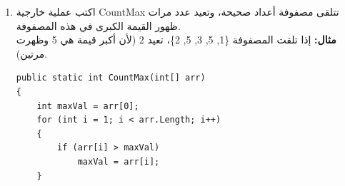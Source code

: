 \documentclass[14pt]{extarticle}
\begin{document}
\begin{enumerate}[itemsep=3em]
\begin{english}
\begin{enumerate}[itemsep=1.5em]
        \item \texttt{Console.WriteLine(arr[7]);}\\
        \\ \underline{\hspace{10cm}}
        \ifwithsols
        \begin{boxSolution}
        \textbf{الجواب:} \textbf{خطأ في وقت التشغيل} (\textenglish{IndexOutOfRangeException})\\
        \textbf{السبب:} الفهرس 7 خارج حدود المصفوفة. آخر فهرس صالح هو 6.
        \end{boxSolution}
        \fi

        \item \texttt{Console.WriteLine(arr[arr.Length]);}\\
        \\ \underline{\hspace{10cm}}
        \ifwithsols
        \begin{boxSolution}
        \textbf{الجواب:} \textbf{خطأ في وقت التشغيل} (\textenglish{IndexOutOfRangeException})\\
        \textbf{السبب:} \textenglish{arr.Length} يساوي 7، لكن آخر فهرس صالح هو 6. هذا خطأ شائع!
        \end{boxSolution}
        \fi

        \item \texttt{Console.WriteLine(arr[arr.Length - 1]);}\\
        \\ \underline{\hspace{10cm}}
        \ifwithsols
        \begin{boxSolution}
        \textbf{الجواب:} \textenglish{12}\\
        \textbf{السبب:} \textenglish{arr.Length - 1} يساوي $7 - 1 = 6$، والعنصر في الموقع 6 هو 12. هذه هي الطريقة الصحيحة للوصول إلى آخر عنصر!
        \end{boxSolution}
        \fi
    \end{enumerate}
    \end{english}
    \clearpage

    \item
    اكتب عملية خارجية \textenglish{CountMax} تتلقى مصفوفة أعداد صحيحة، وتعيد عدد مرات ظهور القيمة الكبرى في هذه المصفوفة. \\
    \textbf{مثال:} إذا تلقت المصفوفة \textenglish{\{1, 5, 3, 5, 2\}}، تعيد 2 (لأن أكبر قيمة هي 5 وظهرت مرتين).
    \ifwithsols
    \begin{boxSolution}
    \begin{english}
    \begin{verbatim}
public static int CountMax(int[] arr)
{
    int maxVal = arr[0];
    for (int i = 1; i < arr.Length; i++)
    {
        if (arr[i] > maxVal)
            maxVal = arr[i];
    }


\end{verbatim}
\end{english}
\end{boxSolution}
\end{enumerate}
\end{document}
